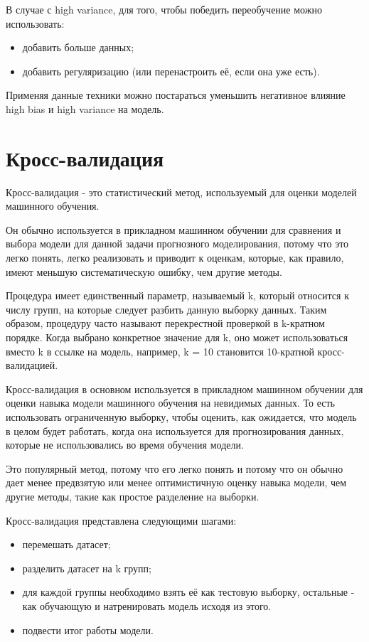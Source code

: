В случае с high variance, для того, чтобы победить переобучение можно использовать:

\begin{itemize}
	\item добавить больше данных;
	\item добавить регуляризацию (или перенастроить её, если она уже есть).
\end{itemize}

Применяя данные техники можно постараться уменьшить негативное влияние high bias и high variance на модель.

\section{Кросс-валидация}

Кросс-валидация - это статистический метод, используемый для оценки моделей машинного обучения.

Он обычно используется в прикладном машинном обучении для сравнения и выбора модели для данной задачи прогнозного моделирования, потому что это легко понять, легко реализовать и приводит к оценкам, которые, как правило, имеют меньшую систематическую ошибку, чем другие методы.

Процедура имеет единственный параметр, называемый k, который относится к числу групп, на которые следует разбить данную выборку данных. Таким образом, процедуру часто называют перекрестной проверкой в k-кратном порядке. Когда выбрано конкретное значение для k, оно может использоваться вместо k в ссылке на модель, например, k = 10 становится 10-кратной кросс-валидацией.

Кросс-валидация в основном используется в прикладном машинном обучении для оценки навыка модели машинного обучения на невидимых данных. То есть использовать ограниченную выборку, чтобы оценить, как ожидается, что модель в целом будет работать, когда она используется для прогнозирования данных, которые не использовались во время обучения модели.

Это популярный метод, потому что его легко понять и потому что он обычно дает менее предвзятую или менее оптимистичную оценку навыка модели, чем другие методы, такие как простое разделение на выборки. \cite{cv}

Кросс-валидация представлена следующими шагами:

\begin{itemize}
	\item перемешать датасет;
	\item разделить датасет на k групп;
	\item для каждой группы необходимо взять её как тестовую выборку, остальные - как обучающую и натренировать модель исходя из этого. 
	\item подвести итог работы модели.
\end{itemize}

